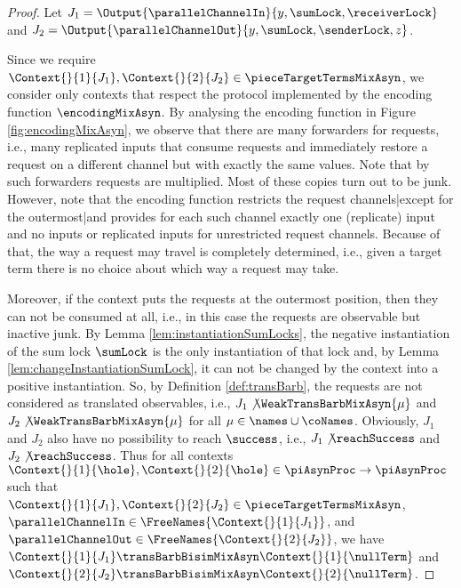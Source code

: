 \documentclass[]{llncs}
\begin{document}
\begin{proof}
	Let $ J_1 = \Output{\parallelChannelIn}{y, \sumLock, \receiverLock} $ and $ J_2 = \Output{\parallelChannelOut}{y, \sumLock, \senderLock, z} $.
	
	Since we require $ \Context{}{1}{J_1}, \Context{}{2}{J_2} \in \pieceTargetTermsMixAsyn $, we consider only contexts that respect the protocol implemented by the encoding function $ \encodingMixAsyn $. By analysing the encoding function in Figure \ref{fig:encodingMixAsyn}, we observe that there are many forwarders for requests, i.e., many replicated inputs that consume requests and immediately restore a request on a different channel but with exactly the same values. Note that by such forwarders requests are multiplied. Most of these copies turn out to be junk. However, note that the encoding function restricts the request channels|except for the outermost|and provides for each such channel exactly one (replicate) input and no inputs or replicated inputs for unrestricted request channels. Because of that, the way a request may travel is completely determined, i.e., given a target term there is no choice about which way a request may take.
	
	Moreover, if the context puts the requests at the outermost position, then they can not be consumed at all, i.e., in this case the requests are observable but inactive junk. By Lemma \ref{lem:instantiationSumLocks}, the negative instantiation of the sum lock $ \sumLock $ is the only instantiation of that lock and, by Lemma \ref{lem:changeInstantiationSumLock}, it can not be changed by the context into a positive instantiation. So, by Definition \ref{def:transBarb}, the requests are not considered as translated observables, i.e., $ J_1\not\WeakTransBarbMixAsyn{\mu} $ and $ J_2\not\WeakTransBarbMixAsyn{\mu} $ for all $ \mu \in \names \cup \coNames $. Obviously, $ J_1 $ and $ J_2 $ also have no possibility to reach $ \success $, i.e., $ J_1\not\reachSuccess $ and $ J_2\not\reachSuccess $. Thus for all contexts $ \Context{}{1}{\hole}, \Context{}{2}{\hole} \in \piAsynProc \to \piAsynProc $ such that $ \Context{}{1}{J_1}, \Context{}{2}{J_2} \in \pieceTargetTermsMixAsyn $, $ \parallelChannelIn \in \FreeNames{\Context{}{1}{J_1}} $, and $ \parallelChannelOut \in \FreeNames{\Context{}{2}{J_2}} $, we have $ \Context{}{1}{J_1} \transBarbBisimMixAsyn \Context{}{1}{\nullTerm} $ and $ \Context{}{2}{J_2} \transBarbBisimMixAsyn \Context{}{2}{\nullTerm} $.
	

\end{proof}
\end{document}
